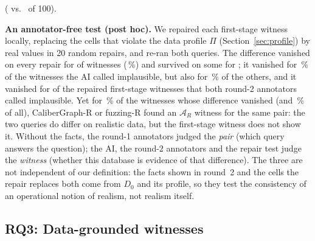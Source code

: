 ( vs.\  of 100).

\textbf{An annotator-free test (post hoc).} We repaired each first-stage witness locally, replacing the cells that violate the data profile $\Pi$ (Section~\ref{sec:profile}) by real values in 20 random repairs, and re-ran both queries. The difference vanished on every repair for  of  witnesses (\,\%) and survived on some for ; it vanished for \,\% of the witnesses the AI called implausible, but also for \,\% of the others, and it vanished for  of the  repaired first-stage witnesses that both round-2 annotators called implausible. Yet for \,\% of the witnesses whose difference vanished (and \,\% of all), CaliberGraph-R or fuzzing-R found an $\mathcal A_R$ witness for the same pair: the two queries do differ on realistic data, but the first-stage witness does not show it. Without the facts, the round-1 annotators judged the \emph{pair} (which query answers the question); the AI, the round-2 annotators and the repair test judge the \emph{witness} (whether this database is evidence of that difference). The three are not independent of our definition: the facts shown in round~2 and the cells the repair replaces both come from $D_0$ and its profile, so they test the consistency of an operational notion of realism, not realism itself.


\subsection{RQ3: Data-grounded witnesses}\label{sec:rresults}

\begin{table}[t]
\centering\footnotesize
\caption{The data profile $\Pi$ mined from the eleven BIRD databases (75 tables, 3.9\,M rows; 258\,s on one core) and the share of first-stage $\mathcal A_{1f}$ witnesses (distinct EX-correct pairs) that violate each constraint class on the columns either query references (post hoc). CG: CaliberGraph; PSE: ParSEval-L1.}\label{tab:profile}
\setlength{\tabcolsep}{2pt}\scriptsize
{}
\end{table}

